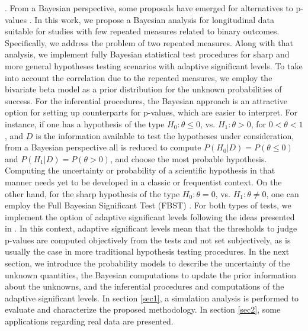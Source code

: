 \documentclass[AMA,Times1COL]{WileyNJDv5} %
\begin{document}
\cite{siegfried2010odds, cumming2013problem, siegfried2014make, nuzzo2014scientific, wasserstein2016asa}. From a Bayesian perspective, some proposals have emerged for alternatives to p-values \cite{johnson2013revised, pericchi2014adaptive, benjamin2016comment}.
In this work, we propose a Bayesian analysis for longitudinal data suitable for studies with few repeated measures related to binary outcomes. Specifically, we address the problem of two repeated measures. Along with that analysis, we implement fully Bayesian statistical test procedures for sharp and more general hypotheses testing scenarios with adaptive significant levels. To take into account the correlation due to the repeated measures, we employ the bivariate beta model as a prior distribution \cite{Olkin03, BIBBY2011} for the unknown probabilities of success. For the inferential procedures, the Bayesian approach is an attractive option for setting up counterparts for p-values, which are easier to interpret. For instance, if one has a hypothesis of the type $H_0: \theta\leq 0$, vs. $H_1: \theta>0$, for $0<\theta<1$, and $D$ is the information available to test the hypotheses under consideration, from a Bayesian perspective all is reduced to compute $P(H_0|D)=P(\theta\leq 0)$ and $P(H_1|D)=P(\theta> 0)$, and choose the most probable hypothesis. Computing the uncertainty or probability of a scientific hypothesis in that manner needs yet to be developed in a classic or frequentist context. On the other hand, for the sharp hypothesis of the type $H_0: \theta = 0$, vs. $H_1: \theta\neq 0$, one can employ the Full Bayesian Significant Test (FBST) \cite{PerSter-99, PerSteWech-08}. For both types of tests, we implement the option of adaptive significant levels following the ideas presented in \cite{Patino-23, GannonPer-2019, PeriPere-16}. In this context, adaptive significant levels mean that the thresholds to judge p-values are computed objectively from the tests and not set subjectively, as is usually the case in more traditional hypothesis testing procedures. In the next section, we introduce the probability models to describe the uncertainty of the unknown quantities, the Bayesian computations to update the prior information about the unknowns, and the inferential procedures and computations of the adaptive significant levels. In section \ref{sec1}, a simulation analysis is performed to evaluate and characterize the proposed methodology. In section \ref{sec2}, some applications regarding real data are presented. 
\end{document}
